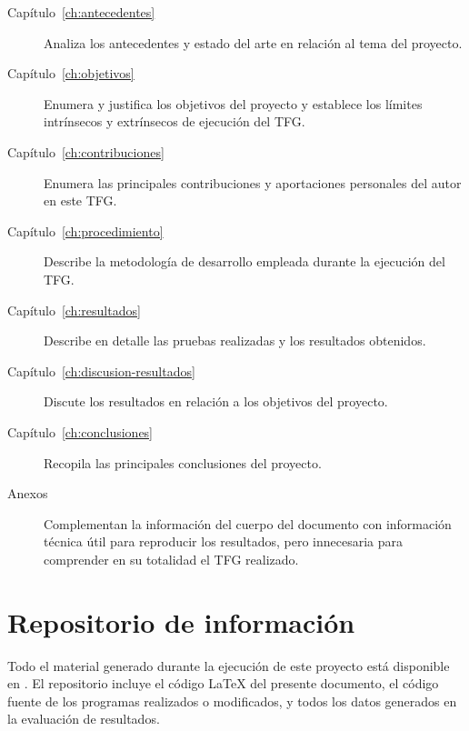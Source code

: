 \begin{description}
    \item[Capítulo~\ref{ch:antecedentes}] Analiza los antecedentes y estado del arte en relación al tema del proyecto.
    \item[Capítulo~\ref{ch:objetivos}] Enumera y justifica los objetivos del proyecto y establece los límites intrínsecos y extrínsecos de ejecución del TFG.
    \item[Capítulo~\ref{ch:contribuciones}] Enumera las principales contribuciones y aportaciones personales del autor en este TFG.
    \item[Capítulo~\ref{ch:procedimiento}] Describe la metodología de desarrollo empleada durante la ejecución del TFG.
    \item[Capítulo~\ref{ch:resultados}] Describe en detalle las pruebas realizadas y los resultados obtenidos.
    \item[Capítulo~\ref{ch:discusion-resultados}] Discute los resultados en relación a los objetivos del proyecto.
    \item[Capítulo~\ref{ch:conclusiones}] Recopila las principales conclusiones del proyecto.
    \item[Anexos] Complementan la información del cuerpo del documento con información técnica útil para reproducir los resultados, pero innecesaria para comprender en su totalidad el TFG realizado.
\end{description}


\section{Repositorio de información}
\label{sec:repositorio}

Todo el material generado durante la ejecución de este proyecto está disponible en \thegitrepo{}.  El repositorio incluye el código \LaTeX{} del presente documento, el código fuente de los programas realizados o modificados, y todos los datos generados en la evaluación de resultados.